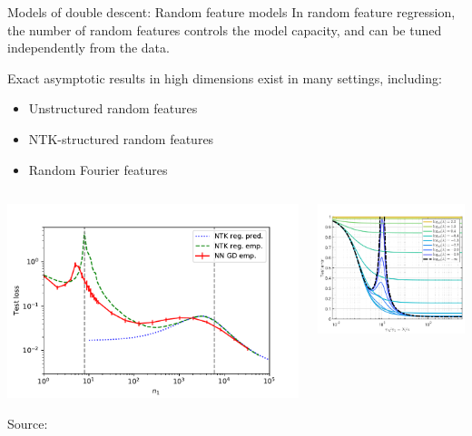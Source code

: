 \documentclass[10pt, aspectratio=169]{beamer}
\begin{document}
\begin{frame}{Models of double descent: Random feature models}
In random feature regression, the number of random features controls the model capacity, and can be tuned independently from the data.

Exact asymptotic results in high dimensions exist in many settings, including:
\begin{itemize}
    \item Unstructured random features~\citep{mei2019generalization}
    \item NTK-structured random features~\citep{adlam2020neural}
    \item Random Fourier features~\citep{liao2020random}
\end{itemize}
\begin{columns}
\begin{column}{0.5\linewidth}
\begin{center}
\includegraphics[width=0.75\linewidth]{part-4-images/gd_v2.pdf}

\vspace{-0.2cm}
{\scriptsize Source: \citep{adlam2020neural}}
\end{center}

\end{column}
\begin{column}{0.5\linewidth}
\begin{center}
\hspace{-1cm}\includegraphics[width=0.6\linewidth]{part-1-images/mei-montanari-double-descent.png}


\end{center}
\end{column}
\end{columns}
\end{frame}
\end{document}
